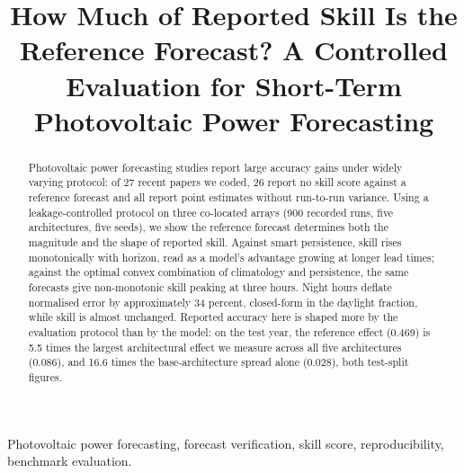 \documentclass[conference]{IEEEtran}
\begin{document}
\title{How Much of Reported Skill Is the Reference Forecast? A
Controlled Evaluation for Short-Term Photovoltaic Power Forecasting}

\author{
}

\maketitle

\begin{abstract}
Photovoltaic power forecasting studies report large accuracy gains
under widely varying protocol: of 27 recent papers we coded, 26 report
no skill score against a reference forecast and all report point
estimates without run-to-run variance. Using a leakage-controlled protocol on three
co-located arrays (900 recorded runs, five architectures, five seeds),
we show the reference forecast determines both the magnitude and the
shape of reported skill. Against smart persistence, skill rises
monotonically with horizon, read as a model's advantage growing at
longer lead times; against the optimal convex combination of
climatology and persistence, the same forecasts give non-monotonic
skill peaking at three hours. Night hours deflate normalised error by
approximately 34 percent, closed-form in the daylight fraction, while
skill is almost unchanged. Reported accuracy here is shaped more by
the evaluation protocol than by the model: on the test year, the
reference effect (0.469) is 5.5 times the largest architectural
effect we measure across all five architectures (0.086), and 16.6
times the base-architecture spread alone (0.028), both test-split
figures.
\end{abstract}

\begin{IEEEkeywords}
Photovoltaic power forecasting, forecast verification, skill score,
reproducibility, benchmark evaluation.
\end{IEEEkeywords}










\end{document}
